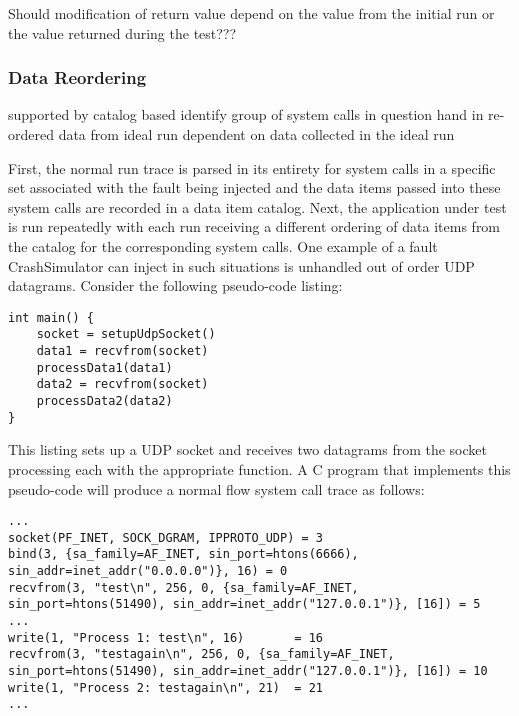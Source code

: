             Should modification of return value depend on the value from the initial run or the value returned during
            the test???

        \subsubsection{Data Reordering}

            supported by catalog based
            identify group of system calls in question
            hand in re-ordered data from ideal run
            dependent on data collected in the ideal run


            First, the normal run trace is parsed in its entirety for system calls in a specific set
            associated with the fault being injected and the data items passed into these system calls are recorded in a
            data item catalog. Next, the application under test is run repeatedly with each run receiving a different
            ordering of data items from the catalog for the corresponding system calls. One example of a fault
            CrashSimulator can inject in such situations is unhandled out of order UDP datagrams. Consider the following
            pseudo-code listing:

            \begin{verbatim}
int main() {
    socket = setupUdpSocket()
    data1 = recvfrom(socket)
    processData1(data1)
    data2 = recvfrom(socket)
    processData2(data2)
}
            \end{verbatim}

            This listing sets up a UDP socket and receives two datagrams from the socket processing each with the
            appropriate function. A C program that implements this pseudo-code will produce a normal flow system call trace
            as follows:

            \begin{verbatim}
...
socket(PF_INET, SOCK_DGRAM, IPPROTO_UDP) = 3
bind(3, {sa_family=AF_INET, sin_port=htons(6666), sin_addr=inet_addr("0.0.0.0")}, 16) = 0
recvfrom(3, "test\n", 256, 0, {sa_family=AF_INET, sin_port=htons(51490), sin_addr=inet_addr("127.0.0.1")}, [16]) = 5
...
write(1, "Process 1: test\n", 16)       = 16
recvfrom(3, "testagain\n", 256, 0, {sa_family=AF_INET, sin_port=htons(51490), sin_addr=inet_addr("127.0.0.1")}, [16]) = 10
write(1, "Process 2: testagain\n", 21)  = 21
...
            \end{verbatim}

